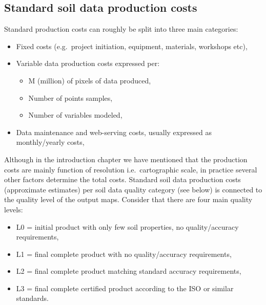 \documentclass[graybox,natbib,nospthms,UStrade]{svmono}
\providecommand{\tightlist}{%
  \setlength{\itemsep}{0pt}\setlength{\parskip}{0pt}}
\providecommand{\tightlist}{\setlength{\itemsep}{0pt}\setlength{\parskip}{0pt}}
\begin{document}
\hypertarget{standard-soil-data-production-costs}{%
\subsection{Standard soil data production costs}\label{standard-soil-data-production-costs}}

Standard production costs can roughly be split into three main
categories:

\begin{itemize}
\item
  Fixed costs (e.g.~project initiation, equipment, materials,
  workshops etc),
\item
  Variable data production costs expressed per:

  \begin{itemize}
  \tightlist
  \item
    M (million) of pixels of data produced,
  \item
    Number of points samples,
  \item
    Number of variables modeled,
  \end{itemize}
\item
  Data maintenance and web-serving costs, usually expressed as
  monthly/yearly costs,
\end{itemize}

Although in the introduction chapter we have mentioned that the production costs are mainly function of
resolution i.e.~cartographic scale, in practice several other factors determine the total costs.
Standard soil data production costs (approximate estimates) per
soil data quality category (see below) is connected to the quality level of the output maps.
Consider that there are four main quality levels:

\begin{itemize}
\item
  L0 = initial product with only few soil properties, no quality/accuracy requirements,
\item
  L1 = final complete product with no quality/accuracy requirements,
\item
  L2 = final complete product matching standard accuracy requirements,
\item
  L3 = final complete certified product according to the ISO or similar standards.
\end{itemize}
\end{document}
